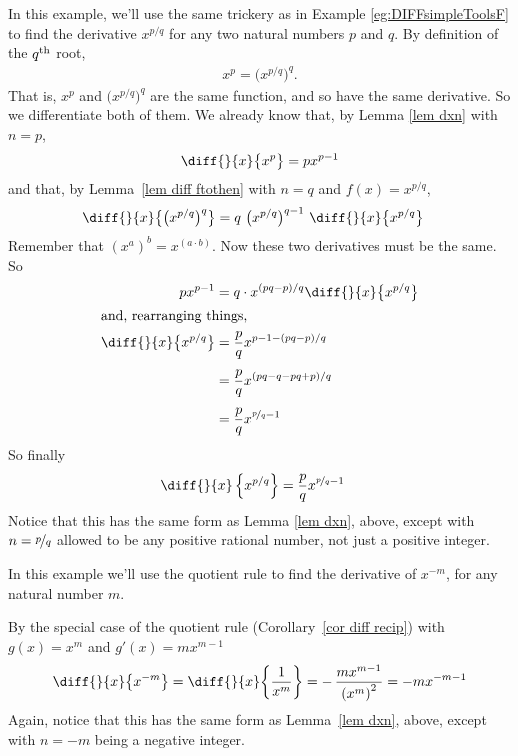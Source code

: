 \begin{eg}\label{eg:DIFFsimpleToolsG}
In this example, we'll use the same trickery as in Example
\ref{eg:DIFFsimpleToolsF} to find the derivative $x^{p/q}$
for any two natural numbers $p$ and $q$. By definition
of the $q^{\rm th}$ root,
\begin{align*}
x^p= \big(x^{p/q}\big)^q.
\end{align*}
That is, $x^p$ and  $\big(x^{p/q}\big)^q$ are the same function, and so have the same
derivative. So we differentiate both of them. We already know that, by Lemma \ref{lem
dxn}
with $n=p$,
\begin{align*}
\diff{}{x}\big\{x^p\big\}=p x^{p-1}
\end{align*}
and that, by Lemma~\ref{lem diff ftothen} with $n=q$ and $f(x)=x^{p/q}$,
\begin{align*}
\diff{}{x}\big\{\big(x^{p/q}\big)^q\big\}
& = q\ \big(x^{p/q}\big)^{q-1}\ \diff{}{x}\big\{x^{p/q}\big\}
\end{align*}
Remember that $(x^a)^b = x^{(a \cdot b)}$. Now these two derivatives
must be the same. So
\begin{align*}
p x^{p-1} &=q\cdot x^{(pq-p)/q} \diff{}{x}\big\{x^{p/q}\big\} \\
\intertext{and, rearranging things,}
\diff{}{x}\big\{x^{p/q}\big\}
   & =\frac{p}{q} x^{p-1-(pq-p)/q} \\[0.05in]
   & =\frac{p}{q} x^{(pq-q-pq+p)/q} \\[0.05in]
   & =\frac{p}{q} x^{\nicefrac{p}{q}-1}
\end{align*}
So finally
\begin{align}\label{eq:DIFFxpoverq}
  \diff{}{x} \left\{ x^{p/q} \right\} &= \frac{p}{q} x^{\nicefrac{p}{q} -1 }
\end{align}
Notice that this has the same form as Lemma \ref{lem dxn}, above,
except with $n=\nicefrac{p}{q}$ allowed to be any positive rational
number, not just a positive integer.
\end{eg}



\begin{eg}[Derivative of $x^{-m}$]\label{eg:DIFFsimpleToolsI}
In this example we'll use the quotient rule to find the derivative of
$x^{-m}$, for any natural number $m$.

By the special case of the quotient rule (Corollary~\ref{cor diff recip}) with $g(x)=x^m$
and $g'(x)=mx^{m-1}$
\begin{align*}
\diff{}{x}\big\{x^{-m}\big\}
=\diff{}{x}\bigg\{\frac{1}{x^m}\bigg\}
=-\,\frac{mx^{m-1}}{{(x^m)}^2}
=-m x^{-m-1}
\end{align*}
Again, notice that this has the same form as Lemma~\ref{lem dxn},
above, except with $n=-m$ being a negative integer.
\end{eg}


